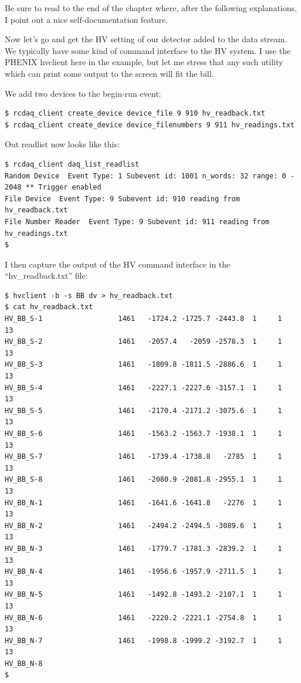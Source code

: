 \documentclass{article}[11pt]
\begin{document}
Be sure to read to the end of the chapter where, after the following
explanations, I point out a nice self-documentation feature.

Now let's go and get the HV setting of our detector added to the data
stream. We typically have some kind of command interface to the HV
system. I use the PHENIX hvclient here in the example, but let me
stress that any such utility which can print some output to the screen
will fit the bill.

We add two devices to the begin-run event:

\begin{verbatim}
$ rcdaq_client create_device device_file 9 910 hv_readback.txt 
$ rcdaq_client create_device device_filenumbers 9 911 hv_readings.txt
\end{verbatim}

Out readlist now looks like this:

\begin{verbatim}
$ rcdaq_client daq_list_readlist
Random Device  Event Type: 1 Subevent id: 1001 n_words: 32 range: 0 - 2048 ** Trigger enabled
File Device  Event Type: 9 Subevent id: 910 reading from  hv_readback.txt
File Number Reader  Event Type: 9 Subevent id: 911 reading from  hv_readings.txt
$ 
\end{verbatim}


I then capture the output of the HV command interface in the
``hv\_readback.txt'' file:

\begin{verbatim}
$ hvclient -b -s BB dv > hv_readback.txt
$ cat hv_readback.txt
HV_BB_S-1                  1461   -1724.2 -1725.7 -2443.8  1     1    13
HV_BB_S-2                  1461   -2057.4   -2059 -2578.3  1     1    13
HV_BB_S-3                  1461   -1809.8 -1811.5 -2886.6  1     1    13
HV_BB_S-4                  1461   -2227.1 -2227.6 -3157.1  1     1    13
HV_BB_S-5                  1461   -2170.4 -2171.2 -3075.6  1     1    13
HV_BB_S-6                  1461   -1563.2 -1563.7 -1938.1  1     1    13
HV_BB_S-7                  1461   -1739.4 -1738.8   -2785  1     1    13
HV_BB_S-8                  1461   -2080.9 -2081.8 -2955.1  1     1    13
HV_BB_N-1                  1461   -1641.6 -1641.8   -2276  1     1    13
HV_BB_N-2                  1461   -2494.2 -2494.5 -3089.6  1     1    13
HV_BB_N-3                  1461   -1779.7 -1781.3 -2839.2  1     1    13
HV_BB_N-4                  1461   -1956.6 -1957.9 -2711.5  1     1    13
HV_BB_N-5                  1461   -1492.8 -1493.2 -2107.1  1     1    13
HV_BB_N-6                  1461   -2220.2 -2221.1 -2754.8  1     1    13
HV_BB_N-7                  1461   -1998.8 -1999.2 -3192.7  1     1    13
HV_BB_N-8     
$
\end{verbatim}
\end{document}
